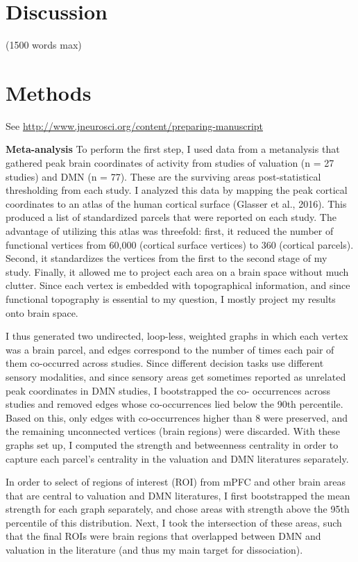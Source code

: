 \documentclass[9pt,twocolumn,twoside,]{pnas-new}
\begin{document}
\section*{Discussion}\label{discussion}

(1500 words max)

\section*{Methods}\label{methods}

See \url{http://www.jneurosci.org/content/preparing-manuscript}

\textbf{Meta-analysis} To perform the first step, I used data from a
metanalysis that gathered peak brain coordinates of activity from
studies of valuation (n = 27 studies) and DMN (n = 77). These are the
surviving areas post-statistical thresholding from each study. I
analyzed this data by mapping the peak cortical coordinates to an atlas
of the human cortical surface (Glasser et al., 2016). This produced a
list of standardized parcels that were reported on each study. The
advantage of utilizing this atlas was threefold: first, it reduced the
number of functional vertices from 60,000 (cortical surface vertices) to
360 (cortical parcels). Second, it standardizes the vertices from the
first to the second stage of my study. Finally, it allowed me to project
each area on a brain space without much clutter. Since each vertex is
embedded with topographical information, and since functional topography
is essential to my question, I mostly project my results onto brain
space.

I thus generated two undirected, loop-less, weighted graphs in which
each vertex was a brain parcel, and edges correspond to the number of
times each pair of them co-occurred across studies. Since different
decision tasks use different sensory modalities, and since sensory areas
get sometimes reported as unrelated peak coordinates in DMN studies, I
bootstrapped the co- occurrences across studies and removed edges whose
co-occurrences lied below the 90th percentile. Based on this, only edges
with co-occurrences higher than 8 were preserved, and the remaining
unconnected vertices (brain regions) were discarded. With these graphs
set up, I computed the strength and betweenness centrality in order to
capture each parcel's centrality in the valuation and DMN literatures
separately.

In order to select of regions of interest (ROI) from mPFC and other
brain areas that are central to valuation and DMN literatures, I first
bootstrapped the mean strength for each graph separately, and chose
areas with strength above the 95th percentile of this distribution.
Next, I took the intersection of these areas, such that the final ROIs
were brain regions that overlapped between DMN and valuation in the
literature (and thus my main target for dissociation).
\end{document}
